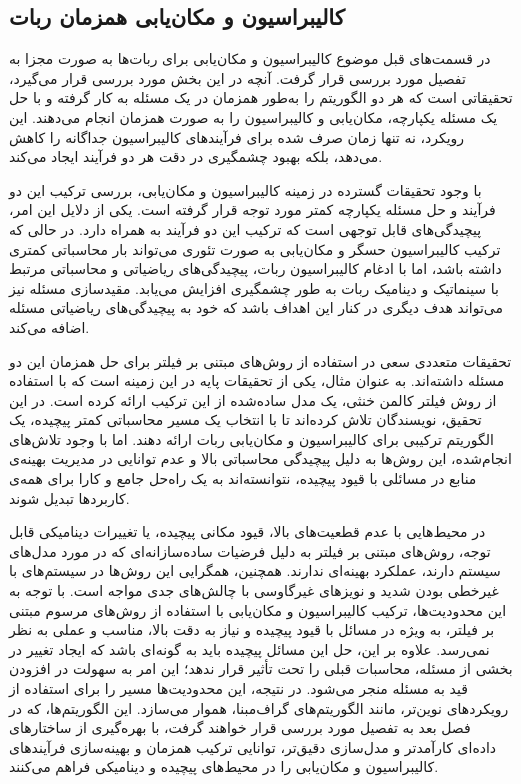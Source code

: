  
\subsection{کالیبراسیون و مکان‌یابی همزمان ربات}

در قسمت‌های قبل موضوع کالیبراسیون و مکان‌یابی برای ربات‌ها به صورت مجزا به تفصیل مورد بررسی قرار گرفت. آنچه در این بخش مورد بررسی قرار می‌گیرد، تحقیقاتی است که هر دو الگوریتم را به‌طور همزمان در یک مسئله به کار گرفته و با حل یک مسئله یکپارچه، مکان‌یابی و کالیبراسیون را به صورت همزمان انجام می‌دهند. این رویکرد، نه تنها زمان صرف شده برای فرآیندهای کالیبراسیون جداگانه را کاهش می‌دهد، بلکه بهبود چشمگیری در دقت هر دو فرآیند ایجاد می‌کند.

با وجود تحقیقات گسترده در زمینه کالیبراسیون و مکان‌یابی، بررسی ترکیب این دو فرآیند و حل مسئله یکپارچه کمتر مورد توجه قرار گرفته است. یکی از دلایل این امر، پیچیدگی‌های قابل توجهی است که ترکیب این دو فرآیند به همراه دارد. در حالی که ترکیب کالیبراسیون حسگر و مکان‌یابی به صورت تئوری می‌تواند بار محاسباتی کمتری داشته باشد، اما با ادغام کالیبراسیون ربات، پیچیدگی‌های ریاضیاتی و محاسباتی مرتبط با سینماتیک و دینامیک ربات به طور چشمگیری افزایش می‌یابد. مقیدسازی مسئله نیز می‌تواند هدف دیگری در کنار این اهداف باشد که خود به پیچیدگی‌های ریاضیاتی مسئله اضافه می‌کند.

تحقیقات متعددی سعی در استفاده از روش‌های مبتنی بر فیلتر برای حل همزمان این دو مسئله داشته‌اند. به عنوان مثال، \cite{kummerle2011simultaneous} یکی از تحقیقات پایه در این زمینه است که با استفاده از روش فیلتر کالمن خنثی، یک مدل ساده‌شده از این ترکیب ارائه کرده است. در این تحقیق، نویسندگان تلاش کرده‌اند تا با انتخاب یک مسیر محاسباتی کمتر پیچیده، یک الگوریتم ترکیبی برای کالیبراسیون و مکان‌یابی ربات ارائه دهند. اما با وجود تلاش‌های انجام‌شده، این روش‌ها به دلیل پیچیدگی محاسباتی بالا و عدم توانایی در مدیریت بهینه‌ی منابع در مسائلی با قیود پیچیده، نتوانسته‌اند به یک راه‌حل جامع و کارا برای همه‌ی کاربردها تبدیل شوند.

در محیط‌هایی با عدم قطعیت‌های بالا، قیود مکانی پیچیده، یا تغییرات دینامیکی قابل توجه، روش‌های مبتنی بر فیلتر به دلیل فرضیات ساده‌سازانه‌ای که در مورد مدل‌های سیستم دارند، عملکرد بهینه‌ای ندارند. همچنین، همگرایی این روش‌ها در سیستم‌های با غیرخطی‌ بودن شدید و نویزهای غیرگاوسی با چالش‌های جدی مواجه است.
با توجه به این محدودیت‌ها، ترکیب کالیبراسیون و مکان‌یابی با استفاده از روش‌های مرسوم مبتنی بر فیلتر، به ویژه در مسائل با قیود پیچیده و نیاز به دقت بالا، مناسب و عملی به نظر نمی‌رسد. علاوه بر این، حل این مسائل پیچیده باید به گونه‌ای باشد که ایجاد تغییر در بخشی از مسئله، محاسبات قبلی را تحت تأثیر قرار ندهد؛ این امر به سهولت در افزودن قید به مسئله منجر می‌شود. در نتیجه، این محدودیت‌ها مسیر را برای استفاده از رویکردهای نوین‌تر، مانند الگوریتم‌های گراف‌مبنا، هموار می‌سازد. این الگوریتم‌ها، که در فصل بعد به تفصیل مورد بررسی قرار خواهند گرفت، با بهره‌گیری از ساختارهای داده‌ای کارآمدتر و مدل‌سازی دقیق‌تر، توانایی ترکیب همزمان و بهینه‌سازی فرآیندهای کالیبراسیون و مکان‌یابی را در محیط‌های پیچیده و دینامیکی فراهم می‌کنند.

